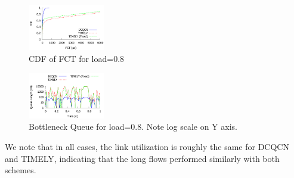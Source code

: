 \begin{figure}[t]
\center
\includegraphics[width=0.3\textwidth]{figures/fct_cdf.pdf}
\caption{CDF of FCT for load=0.8}
\label{fig:fct_cdf}
\end{figure}

\begin{figure}[t]
\center
\includegraphics[width=0.3\textwidth]{figures/fct_queue.pdf}
\caption{Bottleneck Queue for load=0.8. Note log scale on Y axis.}
\label{fig:fct_queue}
\end{figure}
\fi

We note that in all cases, the link utilization is roughly the same for DCQCN
and TIMELY, indicating that the long flows performed similarly with both
schemes.
